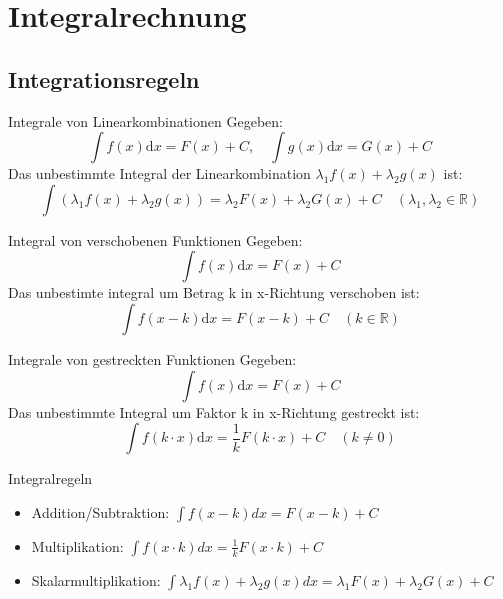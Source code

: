 \section{Integralrechnung}

\subsection{Integrationsregeln}

\begin{definition}{Integrale von Linearkombinationen}
	Gegeben:
	\[\int{f(x)\mathrm{d}x} = F(x)+C, \quad  \int{g(x)\mathrm{d}x} = G(x)+C\]
	Das unbestimmte Integral der Linearkombination \(\lambda_1f(x) + \lambda_2g(x)\) ist:
	\[\int{(\lambda_1f(x)+\lambda_2g(x))} = \lambda_2F(x)+\lambda_2G(x)+C \quad (\lambda_1,\lambda_2 \in \mathbb{R} )\]
\end{definition}
\begin{definition}{Integral von verschobenen Funktionen}
	Gegeben:
	\[\int{f(x)\mathrm{d}x} = F(x) + C \]
	Das unbestimte integral um Betrag k in x-Richtung verschoben ist:
	\[\int{f(x-k)\mathrm{d}x}= F(x-k)+C \quad (k \in \mathbb{R}) \]
\end{definition}
\begin{definition}{Integrale von gestreckten Funktionen}
	Gegeben:
	\[\int{f(x)\mathrm{d}x} = F(x)+C \]
	Das unbestimmte Integral um Faktor k in x-Richtung gestreckt ist:
	\[\int{f(k\cdot x)\mathrm{d}x}= \frac{1}{k}F(k\cdot x)+C \quad (k\neq0 )\]
\end{definition}

\begin{concept}{Integralregeln}
    \begin{itemize}
      \item Addition/Subtraktion:
      $\int f(x-k) d x=F(x-k)+C$
      \item Multiplikation:
      $\int f(x \cdot k) d x=\frac{1}{k} F(x \cdot k)+C$
      \item Skalarmultiplikation:
      $\int \lambda_{1} f(x)+\lambda_{2} g(x) d x=\lambda_{1} F(x)+\lambda_{2} G(x)+C$
    \end{itemize}
\end{concept}


